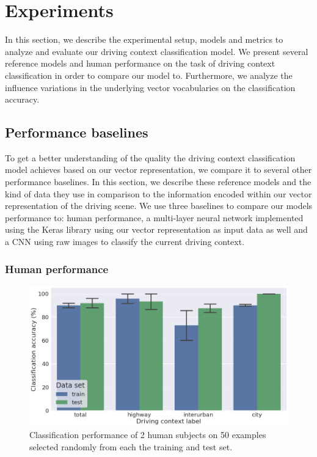 \section{Experiments}%
\label{sec:experiments_context_classificaiton}

In this section, we describe the experimental setup, models and metrics to analyze and evaluate our driving context classification model.
We present several reference models and human performance on the task of driving context classification in order to compare our model to.
Furthermore, we analyze the influence variations in the underlying vector vocabularies on the classification accuracy.

\subsection{Performance baselines}%
\label{subsec:performance_baselines}

To get a better understanding of the quality the driving context classification model achieves based on our vector representation, we compare it to several other performance baselines.
In this section, we describe these reference models and the kind of data they use in comparison to the information encoded within our vector representation of the driving scene.
We use three baselines to compare our models performance to: human performance, a multi-layer neural network implemented using the Keras library \cite{Chollet2015keras} using our vector representation as input data as well and a \ac{CNN} using raw images to classify the current driving context.

\subsubsection{Human performance}%
\label{ssubsec:human_performance}

\begin{figure}[t]
    \centering
    \includegraphics[width=0.8\linewidth]{imgs/context_class_human_train_test.png}
    \caption{Classification performance of \num{2} human subjects on \num{50} examples selected randomly from each the training and test set.}
    \label{fig:context_class_human_train_test}
\end{figure}

